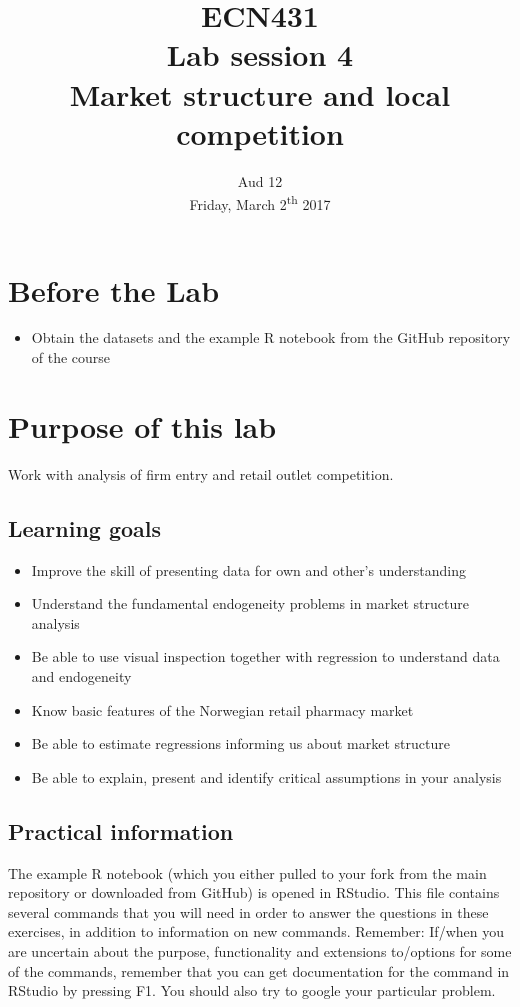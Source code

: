 \documentclass[12pt,a4paper]{article}
\title{ECN431\\Lab session 4\\Market structure and local competition}
\date{Aud 12 \\ Friday, March 2\textsuperscript{th} 2017}
\begin{document}
\maketitle

\section*{Before the Lab}
\begin{itemize}
\item Obtain the datasets and the example R notebook from the GitHub repository of the course
\end{itemize}

\section*{Purpose of this lab}
Work with analysis of firm entry and retail outlet competition.

\subsection*{Learning goals}
\begin{itemize}
\item	Improve the skill of presenting data for own and other's understanding
\item	Understand the fundamental endogeneity problems in market structure analysis
\item	Be able to use visual inspection together with regression to understand data and endogeneity
\item	Know basic features of the Norwegian retail pharmacy market
\item	Be able to estimate regressions informing us about market structure
\item	Be able to explain, present and identify critical assumptions in your analysis
\end{itemize}


\subsection*{Practical information}
The example R notebook (which you either pulled to your fork from the main repository or downloaded from GitHub) is opened in RStudio. This file contains several commands that you will need in order to answer the questions in these exercises, in addition to information on new commands. Remember: If/when you are uncertain about the purpose, functionality and extensions to/options for some of the commands, remember that you can get documentation for the command in RStudio by pressing F1. You should also try to google your particular problem.
\end{document}
